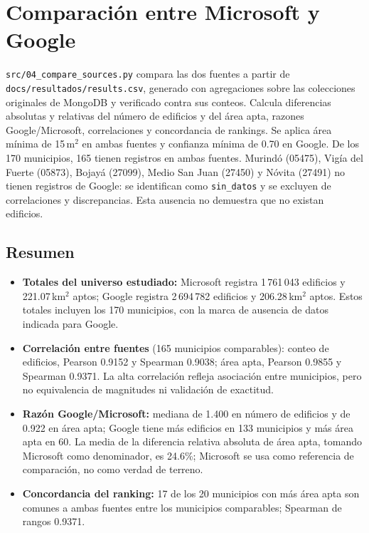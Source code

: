\section{Comparación entre Microsoft y Google}\label{sec:comparacion}
\texttt{src/04\_compare\_sources.py} compara las dos fuentes a partir de \texttt{docs/resultados/results.csv}, generado con agregaciones sobre las colecciones originales de MongoDB y verificado contra sus conteos. Calcula diferencias absolutas y relativas del número de edificios y del área apta, razones Google/Microsoft, correlaciones y concordancia de rankings. Se aplica área mínima de 15\,m$^2$ en ambas fuentes y confianza mínima de 0.70 en Google. De los 170 municipios, 165 tienen registros en ambas fuentes. Murindó (05475), Vigía del Fuerte (05873), Bojayá (27099), Medio San Juan (27450) y Nóvita (27491) no tienen registros de Google: se identifican como \texttt{sin\_datos} y se excluyen de correlaciones y discrepancias. Esta ausencia no demuestra que no existan edificios.

\subsection{Resumen}
\begin{itemize}
  \item \textbf{Totales del universo estudiado:} Microsoft registra 1\,761\,043 edificios y 221.07\,km$^2$ aptos; Google registra 2\,694\,782 edificios y 206.28\,km$^2$ aptos. Estos totales incluyen los 170 municipios, con la marca de ausencia de datos indicada para Google.
  \item \textbf{Correlación entre fuentes} (165 municipios comparables): conteo de edificios, Pearson 0.9152 y Spearman 0.9038; área apta, Pearson 0.9855 y Spearman 0.9371. La alta correlación refleja asociación entre municipios, pero no equivalencia de magnitudes ni validación de exactitud.
  \item \textbf{Razón Google/Microsoft:} mediana de 1.400 en número de edificios y de 0.922 en área apta; Google tiene más edificios en 133 municipios y más área apta en 60. La media de la diferencia relativa absoluta de área apta, tomando Microsoft como denominador, es 24.6\%; Microsoft se usa como referencia de comparación, no como verdad de terreno.
  \item \textbf{Concordancia del ranking:} 17 de los 20 municipios con más área apta son comunes a ambas fuentes entre los municipios comparables; Spearman de rangos 0.9371.
\end{itemize}

